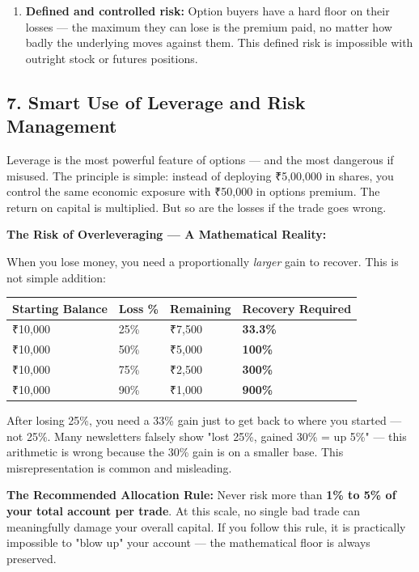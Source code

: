 \documentclass[12pt,openany]{book}
\begin{document}
\begin{enumerate}[leftmargin=*]
    \item \textbf{Defined and controlled risk:} Option buyers have a hard floor on their losses — the maximum they can lose is the premium paid, no matter how badly the underlying moves against them. This defined risk is impossible with outright stock or futures positions.
\end{enumerate}


\subsection{7. Smart Use of Leverage and Risk Management}

Leverage is the most powerful feature of options — and the most dangerous if misused. The principle is simple: instead of deploying ₹5,00,000 in shares, you control the same economic exposure with ₹50,000 in options premium. The return on capital is multiplied. But so are the losses if the trade goes wrong.

\textbf{The Risk of Overleveraging — A Mathematical Reality:}

When you lose money, you need a proportionally \emph{larger} gain to recover. This is not simple addition:

\begin{center}
\scriptsize
\setlength{\tabcolsep}{3pt}
\begin{tabular}{|L{3.30cm}|L{3.30cm}|L{3.30cm}|L{3.30cm}|}
\hline
Starting Balance & Loss \% & Remaining & Recovery Required \\
\hline
₹10,000 & 25\% & ₹7,500 & \textbf{33.3\%} \\
\hline
₹10,000 & 50\% & ₹5,000 & \textbf{100\%} \\
\hline
₹10,000 & 75\% & ₹2,500 & \textbf{300\%} \\
\hline
₹10,000 & 90\% & ₹1,000 & \textbf{900\%} \\
\hline
\end{tabular}
\end{center}

After losing 25\%, you need a 33\% gain just to get back to where you started — not 25\%. Many newsletters falsely show "lost 25\%, gained 30\% = up 5\%" — this arithmetic is wrong because the 30\% gain is on a smaller base. This misrepresentation is common and misleading.

\textbf{The Recommended Allocation Rule:} Never risk more than \textbf{1\% to 5\% of your total account per trade}. At this scale, no single bad trade can meaningfully damage your overall capital. If you follow this rule, it is practically impossible to "blow up" your account — the mathematical floor is always preserved.
\end{document}
